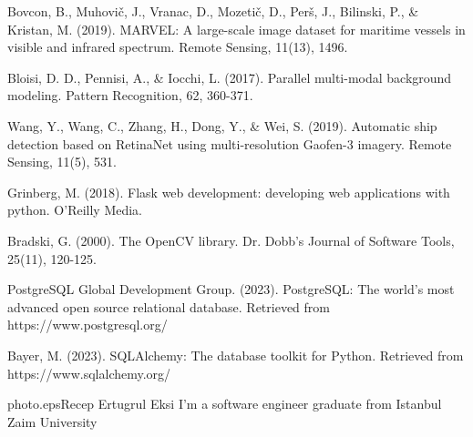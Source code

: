 \documentclass[twoside]{article}
\begin{document}
\begin{multicols}{2}
\begin{thebibliography}{99}
Bovcon, B., Muhovič, J., Vranac, D., Mozetič, D., Perš, J., Bilinski, P., \& Kristan, M. (2019). MARVEL: A large-scale image dataset for maritime vessels in visible and infrared spectrum. Remote Sensing, 11(13), 1496.

Bloisi, D. D., Pennisi, A., \& Iocchi, L. (2017). Parallel multi-modal background modeling. Pattern Recognition, 62, 360-371.

Wang, Y., Wang, C., Zhang, H., Dong, Y., \& Wei, S. (2019). Automatic ship detection based on RetinaNet using multi-resolution Gaofen-3 imagery. Remote Sensing, 11(5), 531.

Grinberg, M. (2018). Flask web development: developing web applications with python. O'Reilly Media.

Bradski, G. (2000). The OpenCV library. Dr. Dobb's Journal of Software Tools, 25(11), 120-125.

PostgreSQL Global Development Group. (2023). PostgreSQL: The world's most advanced open source relational database. Retrieved from https://www.postgresql.org/

Bayer, M. (2023). SQLAlchemy: The database toolkit for Python. Retrieved from https://www.sqlalchemy.org/

\end{thebibliography}

\begin{biography}{photo.eps}{Recep Ertugrul Eksi}
I'm a software engineer graduate from Istanbul Zaim University
\end{biography}

\label{last-page}
\end{multicols}
\label{last-page}
\end{document}
